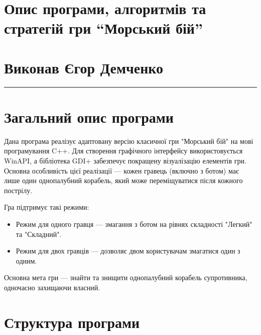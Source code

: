 \documentclass[12pt]{article}
\begin{document}
\section*{Опис програми, алгоритмів та стратегій гри ``Морський бій''}

\section*{Виконав Єгор Демченко}

\hrule
\section{Загальний опис програми}
Дана програма реалізує адаптовану версію класичної гри "Морський бій" на мові програмування C++. Для створення графічного інтерфейсу використовується WinAPI, а бібліотека GDI+ забезпечує покращену візуалізацію елементів гри. Основна особливість цієї реалізації — кожен гравець (включно з ботом) має лише один однопалубний корабель, який може переміщуватися після кожного пострілу.

Гра підтримує такі режими:
\begin{itemize}
    \item Режим для одного гравця — змагання з ботом на рівнях складності "Легкий" та "Складний".
    \item Режим для двох гравців — дозволяє двом користувачам змагатися один з одним.
\end{itemize}

Основна мета гри — знайти та знищити однопалубний корабель супротивника, одночасно захищаючи власний.

\section{Структура програми}
\end{document}
